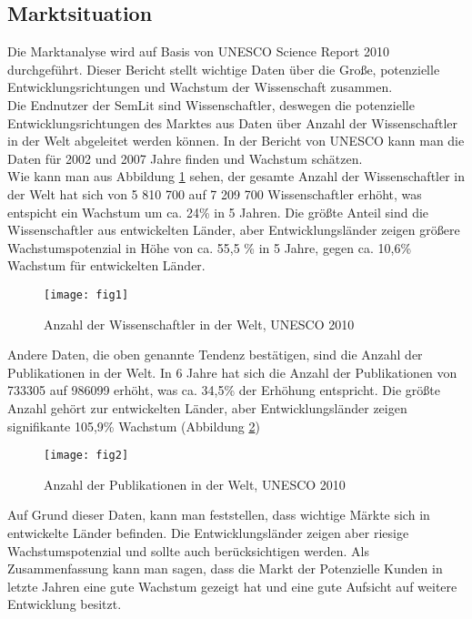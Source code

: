 \subsection{Marktsituation}
Die Marktanalyse wird auf Basis von UNESCO Science Report 2010 durchgeführt. Dieser Bericht stellt wichtige Daten über die Große, potenzielle Entwicklungsrichtungen und Wachstum der Wissenschaft zusammen.\\
Die Endnutzer der SemLit sind Wissenschaftler, deswegen  die potenzielle Entwicklungsrichtungen des Marktes aus Daten über Anzahl der Wissenschaftler in der Welt abgeleitet werden können. In der Bericht von UNESCO kann man die Daten für 2002 und 2007 Jahre finden und Wachstum schätzen.\\
Wie kann man aus Abbildung \ref{fig:fig1} sehen, der gesamte Anzahl der Wissenschaftler in der Welt hat sich von 5 810 700 auf 7 209 700 Wissenschaftler erhöht, was entspicht ein Wachstum um ca. 24\% in 5 Jahren. Die größte Anteil sind die Wissenschaftler aus entwickelten Länder, aber Entwicklungsländer zeigen größere Wachstumspotenzial in Höhe von ca. 55,5 \% in 5 Jahre, gegen ca. 10,6\% Wachstum für entwickelten Länder.\\
\begin{figure}[h!]
\centering
\texttt{[image: fig1]}
\caption{Anzahl der Wissenschaftler in der Welt, UNESCO 2010}
\label{fig:fig1}
\end{figure}
Andere Daten, die oben genannte Tendenz bestätigen, sind die Anzahl der Publikationen in der Welt. In 6 Jahre hat sich die Anzahl der Publikationen von 733305 auf 986099 erhöht, was ca. 34,5\% der Erhöhung entspricht. Die größte Anzahl gehört zur entwickelten Länder, aber Entwicklungsländer zeigen signifikante 105,9\% Wachstum (Abbildung \ref{fig:fig2})\\
\begin{figure}[h!]
\centering
\texttt{[image: fig2]}
\caption{Anzahl der Publikationen in der Welt, UNESCO 2010}
\label{fig:fig2}
\end{figure}
Auf Grund dieser Daten, kann man feststellen, dass  wichtige Märkte sich in entwickelte Länder befinden. Die Entwicklungsländer zeigen aber riesige Wachstumspotenzial und sollte auch berücksichtigen werden. 
Als Zusammenfassung kann man sagen, dass die Markt der Potenzielle Kunden in letzte Jahren eine gute Wachstum gezeigt hat und eine gute Aufsicht auf weitere Entwicklung besitzt.

